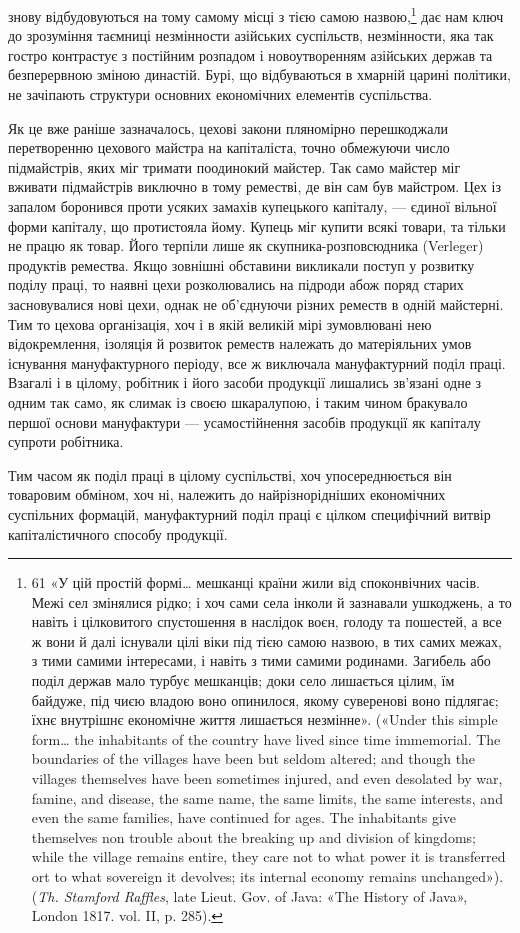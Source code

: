\parcont{}  %
знову відбудовуються на тому самому місці з тією самою назвою,\footnote{
61 «У цій простій формі\dots{} мешканці країни жили від споконвічних
часів. Межі сел змінялися рідко; і хоч сами села інколи й зазнавали
ушкоджень, а то навіть і цілковитого спустошення в наслідок воєн,
голоду та пошестей, а все ж вони й далі існували цілі віки під тією самою
назвою, в тих самих межах, з тими самими інтересами, і навіть з тими
самими родинами. Загибель або поділ держав мало турбує мешканців;
доки село лишається цілим, їм байдуже, під чиєю владою воно опинилося,
якому суверенові воно підлягає; їхнє внутрішнє економічне життя
лишається незмінне». («Under this simple form\dots{} the inhabitants of the
country have lived since time immemorial. The boundaries of the villages
have been but seldom altered; and though the villages themselves have
been sometimes injured, and even desolated by war, famine, and disease,
the same name, the same limits, the same interests, and even the same
families, have continued for ages. The inhabitants give themselves non
trouble about the breaking up and division of kingdoms; while the village
remains entire, they care not to what power it is transferred ort to what
sovereign it devolves; its internal economy remains unchanged»). (\emph{Th. Stamford
Raffles}, late Lieut. Gov. of Java: «The History of Java», London 1817.
vol. II, p. 285).
} дає нам ключ до зрозуміння таємниці незмінности азійських
суспільств, незмінности, яка так гостро контрастує з постійним
розпадом і новоутворенням азійських держав та безперервною
зміною династій. Бурі, що відбуваються в хмарній царині політики,
не зачіпають структури основних економічних елементів
суспільства.

Як це вже раніше зазначалось, цехові закони пляномірно
перешкоджали перетворенню цехового майстра на капіталіста,
точно обмежуючи число підмайстрів, яких міг тримати поодинокий
майстер. Так само майстер міг вживати підмайстрів виключно
в тому реместві, де він сам був майстром. Цех із запалом
боронився проти усяких замахів купецького капіталу, —
єдиної вільної форми капіталу, що протистояла йому. Купець
міг купити всякі товари, та тільки не працю як товар. Його терпіли
лише як скупника-розповсюдника (Verleger) продуктів
ремества. Якщо зовнішні обставини викликали поступ у розвитку
поділу праці, то наявні цехи розколювались на підроди абож
поряд старих засновувалися нові цехи, однак не об’єднуючи різних
реместв в одній майстерні. Тим то цехова організація, хоч і в
якій великій мірі зумовлювані нею відокремлення, ізоляція й
розвиток реместв належать до матеріяльних умов існування
мануфактурного періоду, все ж виключала мануфактурний поділ
праці. Взагалі і в цілому, робітник і його засоби продукції
лишались зв’язані одне з одним так само, як слимак із своєю
шкаралупою, і таким чином бракувало першої основи мануфактури
— усамостійнення засобів продукції як капіталу супроти
робітника.

Тим часом як поділ праці в цілому суспільстві, хоч упосереднюється
він товаровим обміном, хоч ні, належить до найрізнорідніших
економічних суспільних формацій, мануфактурний
поділ праці є цілком специфічний витвір капіталістичного способу
продукції.
